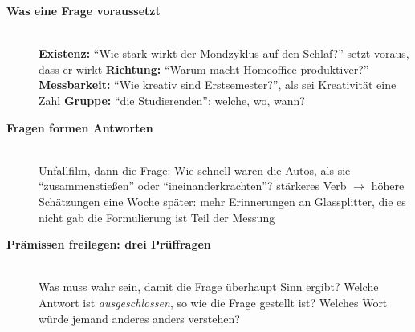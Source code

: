 \begin{description}
\item[{\rot\bf Was eine Frage voraussetzt}]~\\[-\lblskip]
\bi
  \ite \textbf{Existenz:} \enquote{Wie stark wirkt der Mondzyklus auf den
    Schlaf?} setzt voraus, dass er wirkt
  \ite \textbf{Richtung:} \enquote{Warum macht Homeoffice produktiver?}
  \ite \textbf{Messbarkeit:} \enquote{Wie kreativ sind Erstsemester?}, als
    sei Kreativität eine Zahl
  \ite \textbf{Gruppe:} \enquote{die Studierenden}: welche, wo, wann?
\ei
\os{\newpage}

\item[{\rot\bf Fragen formen Antworten}]~\\[-\lblskip]
\bi
  \ite Unfallfilm, dann die Frage: Wie schnell waren die Autos, als sie
    \enquote{zusammenstießen} oder \enquote{ineinanderkrachten}?
  \ite stärkeres Verb $\to$ höhere Schätzungen
  \ite eine Woche später: mehr Erinnerungen an Glassplitter, die es nicht
    gab \parencite{loftus1974reconstruction}
  \ite die Formulierung ist Teil der Messung
\ei
\os{\newpage}

\item[{\rot\bf Prämissen freilegen: drei Prüffragen}]~\\[-\lblskip]
\bi
  \ite Was muss wahr sein, damit die Frage überhaupt Sinn ergibt?
  \ite Welche Antwort ist \emph{ausgeschlossen}, so wie die Frage gestellt
    ist?
  \ite Welches Wort würde jemand anderes anders verstehen?
\ei
{}
\os{\newpage}
\end{description}

